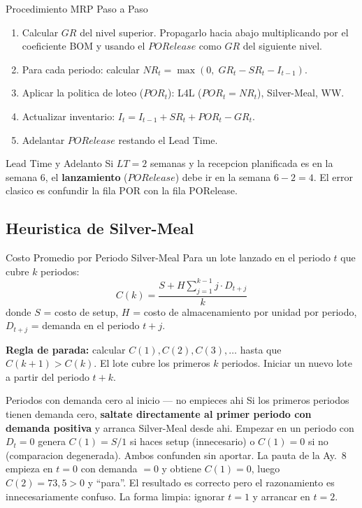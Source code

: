 \documentclass[11pt, a4paper]{article}
\begin{document}
\begin{tipprueba}{Procedimiento MRP Paso a Paso}
  \begin{enumerate}[leftmargin=1.5em, itemsep=2pt]
    \item Calcular $GR$ del nivel superior. Propagarlo hacia abajo multiplicando
          por el coeficiente BOM y usando el $PORelease$ como $GR$ del siguiente nivel.
    \item Para cada periodo: calcular $NR_t = \max(0,\; GR_t - SR_t - I_{t-1})$.
    \item Aplicar la politica de loteo ($POR_t$): L4L ($POR_t = NR_t$), Silver-Meal, WW.
    \item Actualizar inventario: $I_t = I_{t-1} + SR_t + POR_t - GR_t$.
    \item Adelantar $PORelease$ restando el Lead Time.
  \end{enumerate}
\end{tipprueba}

\begin{trampa}{Lead Time y Adelanto}
  Si $LT = 2$ semanas y la recepcion planificada es en la semana 6,
  el \textbf{lanzamiento} ($PORelease$) debe ir en la semana $6 - 2 = 4$.
  El error clasico es confundir la fila POR con la fila PORelease.
\end{trampa}

\subsection{Heuristica de Silver-Meal}

\begin{formulas}{Costo Promedio por Periodo Silver-Meal}
  Para un lote lanzado en el periodo $t$ que cubre $k$ periodos:
  \[
    C(k) = \frac{S + H \sum_{j=1}^{k-1} j \cdot D_{t+j}}{k}
  \]
  donde $S$ = costo de setup, $H$ = costo de almacenamiento por unidad por periodo,
  $D_{t+j}$ = demanda en el periodo $t+j$.

  \medskip
  \textbf{Regla de parada:} calcular $C(1), C(2), C(3), \ldots$ hasta que
  $C(k+1) > C(k)$. El lote cubre los primeros $k$ periodos.
  Iniciar un nuevo lote a partir del periodo $t + k$.
\end{formulas}

\begin{trampa}{Periodos con demanda cero al inicio --- no empieces ahi}
  Si los primeros periodos tienen demanda cero, \textbf{saltate directamente al primer
  periodo con demanda positiva} y arranca Silver-Meal desde ahi.
  Empezar en un periodo con $D_t = 0$ genera $C(1) = S/1$ si haces setup (innecesario)
  o $C(1) = 0$ si no (comparacion degenerada). Ambos confunden sin aportar.
  \medskip
  La pauta de la Ay.\ 8 empieza en $t=0$ con demanda $=0$ y obtiene $C(1) = 0$,
  luego $C(2) = 73{,}5 > 0$ y ``para''. El resultado es correcto pero el razonamiento
  es innecesariamente confuso. La forma limpia: ignorar $t=1$ y arrancar en $t=2$.
\end{trampa}
\end{document}
